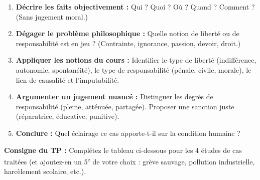 \documentclass[11pt]{article}
\begin{document}
\begin{methode}
\begin{enumerate}
    \item \textbf{Décrire les faits objectivement :} Qui ? Quoi ? Où ? Quand ? Comment ? (Sans jugement moral.)
    \item \textbf{Dégager le problème philosophique :} Quelle notion de liberté ou de responsabilité est en jeu ? (Contrainte, ignorance, passion, devoir, droit.)
    \item \textbf{Appliquer les notions du cours :} Identifier le type de liberté (indifférence, autonomie, spontanéité), le type de responsabilité (pénale, civile, morale), le lien de causalité et l'imputabilité.
    \item \textbf{Argumenter un jugement nuancé :} Distinguer les degrés de responsabilité (pleine, atténuée, partagée). Proposer une sanction juste (réparatrice, éducative, punitive).
    \item \textbf{Conclure :} Quel éclairage ce cas apporte-t-il sur la condition humaine ?
\end{enumerate}
\end{methode}

\noindent\textbf{Consigne du TP :} Complétez le tableau ci-dessous pour les 4 études de cas traitées (et ajoutez-en un 5\textsuperscript{e} de votre choix : grève sauvage, pollution industrielle, harcèlement scolaire, etc.).
\end{document}
